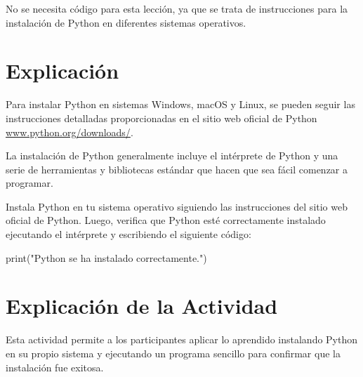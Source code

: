 \documentclass[
  a4paper,
  DIV=11,
  numbers=noendperiod,
  onepage,
  openany]{scrreprt}
\newenvironment{Shaded}{\begin{snugshade}}{\end{snugshade}}
\newcommand{\BuiltInTok}[1]{\textcolor[rgb]{0.00,0.23,0.31}{#1}}
\newcommand{\NormalTok}[1]{\textcolor[rgb]{0.00,0.23,0.31}{#1}}
\newcommand{\StringTok}[1]{\textcolor[rgb]{0.13,0.47,0.30}{#1}}
\begin{document}
No se necesita código para esta lección, ya que se trata de
instrucciones para la instalación de Python en diferentes sistemas
operativos.

\hypertarget{explicaciuxf3n-2}{%
\section{Explicación}\label{explicaciuxf3n-2}}

Para instalar Python en sistemas Windows, macOS y Linux, se pueden
seguir las instrucciones detalladas proporcionadas en el sitio web
oficial de Python
\href{https://www.python.org/downloads/}{www.python.org/downloads/}.

La instalación de Python generalmente incluye el intérprete de Python y
una serie de herramientas y bibliotecas estándar que hacen que sea fácil
comenzar a programar.

\begin{tcolorbox}[enhanced jigsaw, colbacktitle=quarto-callout-important-color!10!white, toprule=.15mm, leftrule=.75mm, titlerule=0mm, opacityback=0, rightrule=.15mm, opacitybacktitle=0.6, breakable, left=2mm, coltitle=black, title=\textcolor{quarto-callout-important-color}{\faExclamation}\hspace{0.5em}{Actividad Práctica}, toptitle=1mm, bottomtitle=1mm, arc=.35mm, bottomrule=.15mm, colback=white, colframe=quarto-callout-important-color-frame]

Instala Python en tu sistema operativo siguiendo las instrucciones del
sitio web oficial de Python. Luego, verifica que Python esté
correctamente instalado ejecutando el intérprete y escribiendo el
siguiente código:

\begin{Shaded}
\begin{Highlighting}[]
\BuiltInTok{print}\NormalTok{(}\StringTok{"Python se ha instalado correctamente."}\NormalTok{)}
\end{Highlighting}
\end{Shaded}

\end{tcolorbox}

\hypertarget{explicaciuxf3n-de-la-actividad-2}{%
\section{Explicación de la
Actividad}\label{explicaciuxf3n-de-la-actividad-2}}

Esta actividad permite a los participantes aplicar lo aprendido
instalando Python en su propio sistema y ejecutando un programa sencillo
para confirmar que la instalación fue exitosa.
\end{document}
